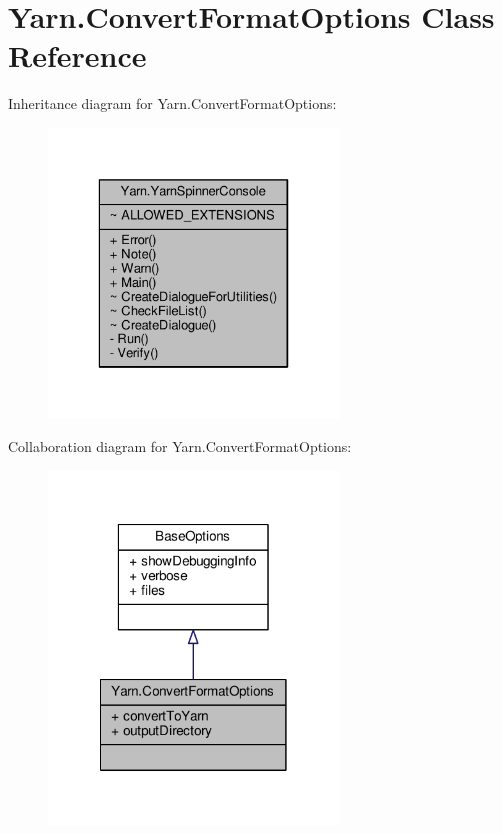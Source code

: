 \hypertarget{a00057}{\section{Yarn.\-Convert\-Format\-Options Class Reference}
\label{a00057}
}


Inheritance diagram for Yarn.\-Convert\-Format\-Options\-:
\nopagebreak
\begin{figure}[H]
\begin{center}
\leavevmode
\includegraphics[width=218pt]{a00666}
\end{center}
\end{figure}


Collaboration diagram for Yarn.\-Convert\-Format\-Options\-:
\nopagebreak
\begin{figure}[H]
\begin{center}
\leavevmode
\includegraphics[width=218pt]{a00667}
\end{center}
\end{figure}

